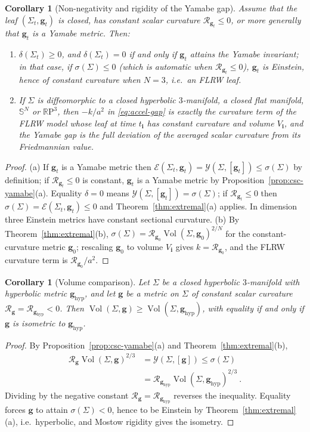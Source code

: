 \documentclass[aps,prd,reprint,amsmath,amssymb,nofootinbib,longbibliography]{revtex4-2}
\DeclareMathOperator{\Vol}{Vol}
\newcommand{\RR}{\mathbb{R}}
\newcommand{\Sph}{\mathbb{S}}
\newcommand{\g}{\mathbf{g}}                 %
\newcommand{\Rs}{\mathcal{R}}               %
\newcommand{\ini}[1]{{#1}_{\mathbf{i}}}     %
\newcommand{\EH}{\mathcal{E}}               %
\newcommand{\Y}{\mathcal{Y}}                %
\theoremstyle{plain}
\newtheorem{corollary}[theorem]{Corollary}
\theoremstyle{definition}
\theoremstyle{remark}
\begin{document}
\begin{corollary}[Non-negativity and rigidity of the Yamabe gap]
\label{cor:gap-nonneg}
Assume that the leaf $(\Sigma_t,\g_t)$ is closed, has constant scalar curvature $\Rs_{\g_t}\le 0$, or more generally that $\g_t$ is a Yamabe metric. Then:
\begin{enumerate}
\item[(a)] $\delta(\Sigma_t)\ge 0$, and $\delta(\Sigma_t)=0$ if and only if $\g_t$ attains the Yamabe invariant; in that case, if $\sigma(\Sigma)\le0$ (which is automatic when $\Rs_{\g_t}\le0$), $\g_t$ is Einstein, hence of constant curvature when $N=3$, i.e.\ an FLRW leaf.
\item[(b)] If $\Sigma$ is diffeomorphic to a closed hyperbolic $3$-manifold, a closed flat manifold, $\Sph^N$ or $\RR\mathrm{P}^3$, then $-k/a^2$ in \eqref{eq:accel-gap} is exactly the curvature term of the FLRW model whose leaf at time $\ini t$ has constant curvature and volume $\ini V$, and the Yamabe gap is the full deviation of the averaged scalar curvature from its Friedmannian value.
\end{enumerate}
\end{corollary}
\begin{proof}
(a) If $\g_t$ is a Yamabe metric then $\EH(\Sigma_t,\g_t)=\Y(\Sigma,[\g_t])\le\sigma(\Sigma)$ by definition; if $\Rs_{\g_t}\le0$ is constant, $\g_t$ is a Yamabe metric by Proposition~\ref{prop:csc-yamabe}(a). Equality $\delta=0$ means $\Y(\Sigma,[\g_t])=\sigma(\Sigma)$; if $\Rs_{\g_t}\le 0$ then $\sigma(\Sigma)=\EH(\Sigma_t,\g_t)\le0$ and Theorem~\ref{thm:extremal}(a) applies. In dimension three Einstein metrics have constant sectional curvature. (b) By Theorem~\ref{thm:extremal}(b), $\sigma(\Sigma)=\Rs_{\g_0}\Vol(\Sigma,\g_0)^{2/N}$ for the constant-curvature metric $\g_0$; rescaling $\g_0$ to volume $\ini V$ gives $k=\Rs_{\g_0}$, and the FLRW curvature term is $\Rs_{\g_0}/a^2$.
\end{proof}

\begin{corollary}[Volume comparison]
\label{cor:volume}
Let $\Sigma$ be a closed hyperbolic $3$-manifold with hyperbolic metric $\g_{\mathrm{hyp}}$, and let $\g$ be a metric on $\Sigma$ of constant scalar curvature $\Rs_\g=\Rs_{\g_{\mathrm{hyp}}}<0$. Then $\Vol(\Sigma,\g)\ge\Vol(\Sigma,\g_{\mathrm{hyp}})$, with equality if and only if $\g$ is isometric to $\g_{\mathrm{hyp}}$.
\end{corollary}
\begin{proof}
By Proposition~\ref{prop:csc-yamabe}(a) and Theorem~\ref{thm:extremal}(b),
\begin{align*}
\Rs_\g\Vol(\Sigma,\g)^{2/3}&=\Y(\Sigma,[\g])\le\sigma(\Sigma)\\
&=\Rs_{\g_{\mathrm{hyp}}}\Vol(\Sigma,\g_{\mathrm{hyp}})^{2/3}\ .
\end{align*}
Dividing by the negative constant $\Rs_\g=\Rs_{\g_{\mathrm{hyp}}}$ reverses the inequality. Equality forces $\g$ to attain $\sigma(\Sigma)<0$, hence to be Einstein by Theorem~\ref{thm:extremal}(a), i.e.\ hyperbolic, and Mostow rigidity gives the isometry.
\end{proof}
\end{document}
